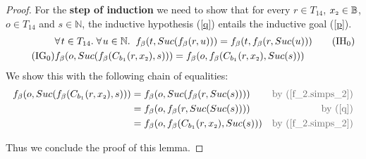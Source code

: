 \documentclass{article}
\theoremstyle{definition}
\begin{document}
\begin{proof}
                 \noindent For the \textbf{step of induction} we need to show that for every $r \in T_{14}$, $x_{\mbox{\tiny 2}} \in \mathbb{B}$, $o \in T_{14}$ and $s \in \mathbb{N}$, the inductive hypothesis (\ref{q}) entails the inductive goal (\ref{p}).
                 \begin{align}
                 \label{q} 
                 &\forall\hspace{1pt} t \in T_{14}. \; \forall\hspace{1pt} u \in \mathbb{N}. \; \; f_{\beta}(t, Suc(f_{\beta}(r, u))) = f_{\beta}(t, f_{\beta}(r, Suc(u)))
                 \tag{IH$_{\thesection}$}
                 \\
                 \label{p} \tag{IG$_{\thesection}$}
                 &f_{\beta}(o, Suc(f_{\beta}(C_{b_{\mbox{\tiny 1}}}(r, x_{\mbox{\tiny 2}}), s))) = f_{\beta}(o, f_{\beta}(C_{b_{\mbox{\tiny 1}}}(r, x_{\mbox{\tiny 2}}), Suc(s)))
                 \end{align}
                 We show this with the following chain of equalities: 
                 \begin{align*}
                 f_{\beta}(o, Suc(f_{\beta}(C_{b_{\mbox{\tiny 1}}}(r, x_{\mbox{\tiny 2}}), s)))
                 &= f_{\beta}(o, Suc(f_{\beta}(r, Suc(s)))) &\mbox{\color{gray}{by (\ref{f_2.simps_2})}}\\
                 &= f_{\beta}(o, f_{\beta}(r, Suc(Suc(s)))) &\mbox{\color{gray}{by (\ref{q})}}\\
                 &= f_{\beta}(o, f_{\beta}(C_{b_{\mbox{\tiny 1}}}(r, x_{\mbox{\tiny 2}}), Suc(s))) &\mbox{\color{gray}{by (\ref{f_2.simps_2})}}
                 \end{align*}
                 
Thus we conclude the proof of this lemma.
\end{proof}
\end{document}
